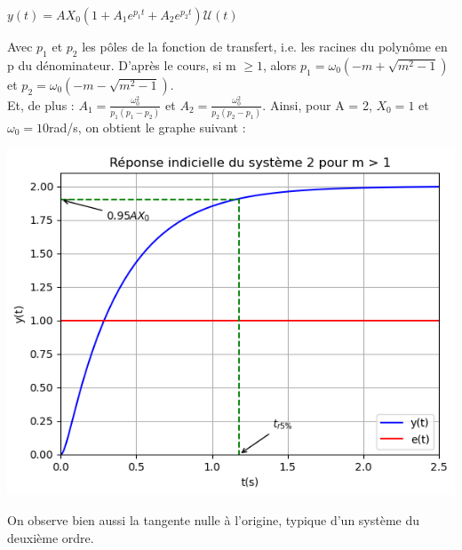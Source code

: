 \documentclass[12pt]{article}
\begin{document}
\begin{center}
    $y(t) = AX_0(1+A_1e^{p_1t} + A_2e^{p_2t})\mathcal{U}(t)$ 
\end{center}    
Avec $p_1$ et $p_2$ les pôles de la fonction de transfert, i.e. les racines du polynôme en p du dénominateur.
D'après le cours, si m $\ge 1$, alors $p_1 = \omega_0(-m+\sqrt{m^2-1})$ et $p_2 = \omega_0(-m-\sqrt{m^2-1})$. 
\\Et, de plus : $A_1 = \frac{\omega_0^2}{p_1(p_1-p_2)}$ et $A_2 = \frac{\omega_0^2}{p_2(p_2-p_1)}$.
Ainsi, pour A = 2, $X_0 = 1$ et $\omega_0 = 10$rad/s, on obtient le graphe suivant :
\begin{center}
    \includegraphics{TP1/Syst_2/Reponse_indicelle_m_sup_1.png}
\end{center}

On observe bien aussi la tangente nulle à l'origine, typique d'un système du deuxième ordre.
\end{document}
